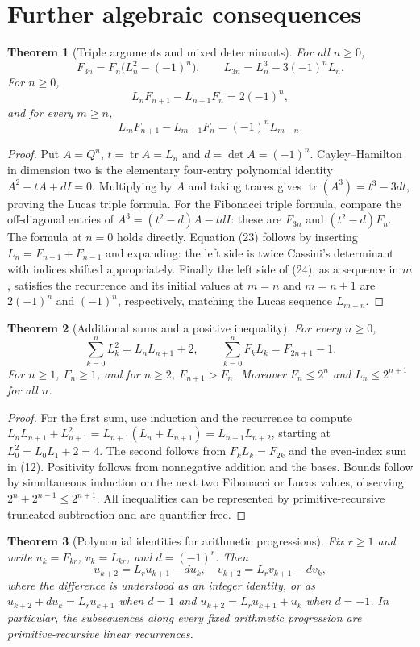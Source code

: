 \documentclass[11pt]{article}
\newtheorem{theorem}{Theorem}[section]
\begin{document}
\section{Further algebraic consequences}
\begin{theorem}[Triple arguments and mixed determinants]
For all $n\ge0$,
\[ F_{3n}=F_n\bigl(L_n^2-(-1)^n\bigr),\qquad
L_{3n}=L_n^3-3(-1)^nL_n.\tag{22}\]
For $n\ge0$,
\[L_nF_{n+1}-L_{n+1}F_n=2(-1)^n,\tag{23}\]
and for every $m\ge n$,
\[L_mF_{n+1}-L_{m+1}F_n=(-1)^nL_{m-n}.\tag{24}\]
\end{theorem}
\begin{proof}
Put $A=Q^n$, $t=\operatorname{tr}A=L_n$ and $d=\det A=(-1)^n$. Cayley--Hamilton in dimension two is the elementary four-entry polynomial identity $A^2-tA+dI=0$. Multiplying by $A$ and taking traces gives $\operatorname{tr}(A^3)=t^3-3dt$, proving the Lucas triple formula. For the Fibonacci triple formula, compare the off-diagonal entries of $A^3=(t^2-d)A-tdI$: these are $F_{3n}$ and $(t^2-d)F_n$. The formula at $n=0$ holds directly. Equation (23) follows by inserting $L_n=F_{n+1}+F_{n-1}$ and expanding: the left side is twice Cassini's determinant with indices shifted appropriately. Finally the left side of (24), as a sequence in $m$, satisfies the recurrence and its initial values at $m=n$ and $m=n+1$ are $2(-1)^n$ and $(-1)^n$, respectively, matching the Lucas sequence $L_{m-n}$.
\end{proof}
\begin{theorem}[Additional sums and a positive inequality]
For every $n\ge0$,
\[\sum_{k=0}^n L_k^2=L_nL_{n+1}+2,\qquad
\sum_{k=0}^n F_kL_k=F_{2n+1}-1.\tag{25}\]
For $n\ge1$, $F_n\ge1$, and for $n\ge2$, $F_{n+1}>F_n$. Moreover $F_n\le 2^n$ and $L_n\le 2^{n+1}$ for all $n$.
\end{theorem}
\begin{proof}
For the first sum, use induction and the recurrence to compute
$L_nL_{n+1}+L_{n+1}^2=L_{n+1}(L_n+L_{n+1})=L_{n+1}L_{n+2}$, starting at $L_0^2=L_0L_1+2=4$. The second follows from $F_kL_k=F_{2k}$ and the even-index sum in (12). Positivity follows from nonnegative addition and the bases. Bounds follow by simultaneous induction on the next two Fibonacci or Lucas values, observing $2^n+2^{n-1}\le2^{n+1}$. All inequalities can be represented by primitive-recursive truncated subtraction and are quantifier-free.
\end{proof}
\begin{theorem}[Polynomial identities for arithmetic progressions]
Fix $r\ge1$ and write $u_k=F_{kr}$, $v_k=L_{kr}$, and $d=(-1)^r$. Then
\[u_{k+2}=L_ru_{k+1}-d u_k,\quad
v_{k+2}=L_rv_{k+1}-d v_k,\tag{26}\]
where the difference is understood as an integer identity, or as $u_{k+2}+d u_k=L_ru_{k+1}$ when $d=1$ and $u_{k+2}=L_ru_{k+1}+u_k$ when $d=-1$. In particular, the subsequences along every fixed arithmetic progression are primitive-recursive linear recurrences.
\end{theorem}
\end{document}
